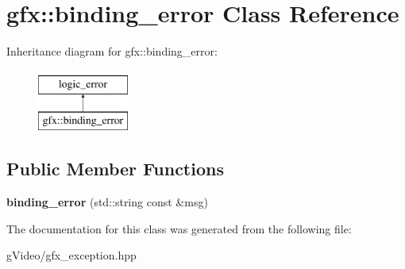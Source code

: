 \hypertarget{classgfx_1_1binding__error}{\section{gfx\-:\-:binding\-\_\-error Class Reference}
\label{classgfx_1_1binding__error}
}
Inheritance diagram for gfx\-:\-:binding\-\_\-error\-:\begin{figure}[H]
\begin{center}
\leavevmode
\includegraphics[height=2.000000cm]{classgfx_1_1binding__error}
\end{center}
\end{figure}
\subsection*{Public Member Functions}
\begin{DoxyCompactItemize}
\item 
\hypertarget{classgfx_1_1binding__error_ad5a740fd9d9e9b9ab1bf30645476b89f}{{\bfseries binding\-\_\-error} (std\-::string const \&msg)}\label{classgfx_1_1binding__error_ad5a740fd9d9e9b9ab1bf30645476b89f}

\end{DoxyCompactItemize}


The documentation for this class was generated from the following file\-:\begin{DoxyCompactItemize}
\item 
g\-Video/gfx\-\_\-exception.\-hpp\end{DoxyCompactItemize}
